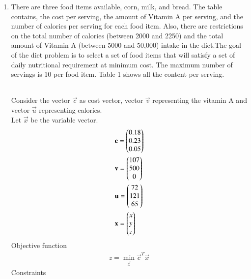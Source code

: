 \documentclass[journal,12pt,twocolumn]{IEEEtran}
\begin{document}
\begin{enumerate}
\item There are three food items available, corn, milk, and bread. The table contains,
the cost per serving, the amount of Vitamin A per serving, and the number of
calories per serving for each food item. Also, there are restrictions on the total
number of calories (between 2000 and 2250) and the total amount of Vitamin A
(between 5000 and 50,000) intake in the diet.The goal of the diet problem is to
select a set of food items that will satisfy a set of daily nutritional requirement
at minimum cost. The maximum number of servings is 10 per food item. Table 1 shows all the content per serving.\\
\begin{table}[H]
 \centering
 \caption{}
 \end{table}
\solution\\ 
Consider the vector $\vec{c}$ as cost vector, vector $\vec{v}$ representing the vitamin A and vector $\vec{u}$ representing calories.\\
Let $\vec{x}$ be the variable vector.\\
\begin{align}
&\mathbf{c} = \begin{pmatrix}0.18\\0.23\\0.05\end{pmatrix}\\
& \mathbf{v} = \begin{pmatrix}107\\500\\0\end{pmatrix}\\
& \mathbf{u} = \begin{pmatrix}72\\121\\65\end{pmatrix}\\
&\mathbf{x} = \begin{pmatrix}x\\y\\z\end{pmatrix}
\end{align}
Objective function 
\begin{align}
z = \min_\vec{x} \vec{c}^T\vec{x}
\end{align}
Constraints
\begin{align}

\end{align}
\end{enumerate}
\end{document}
